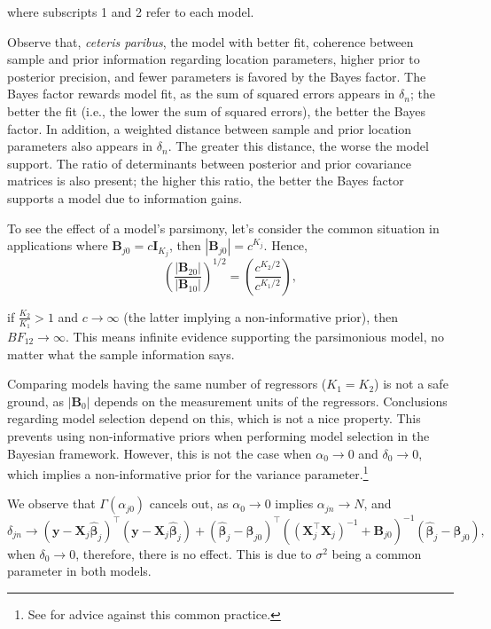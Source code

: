 where subscripts 1 and 2 refer to each model.

Observe that, \textit{ceteris paribus}, the model with better fit, coherence between sample and prior information regarding location parameters, higher prior to posterior precision, and fewer parameters is favored by the Bayes factor. The Bayes factor rewards model fit, as the sum of squared errors appears in \( \delta_n \); the better the fit (i.e., the lower the sum of squared errors), the better the Bayes factor. In addition, a weighted distance between sample and prior location parameters also appears in \( \delta_n \). The greater this distance, the worse the model support. The ratio of determinants between posterior and prior covariance matrices is also present; the higher this ratio, the better the Bayes factor supports a model due to information gains.

To see the effect of a model's parsimony, let's consider the common situation in applications where \( \bm{B}_{j0} = c \bm{I}_{K_j} \), then \( | \bm{B}_{j0} | = c^{K_j} \). Hence, 
\[
\left( \frac{| \bm{B}_{20} |}{| \bm{B}_{10} |} \right)^{1/2} = \left( \frac{c^{K_2/2}}{c^{K_1/2}} \right),
\]

if \( \frac{K_2}{K_1} > 1 \) and \( c \to \infty \) (the latter implying a non-informative prior), then \( BF_{12} \to \infty \). This means infinite evidence supporting the parsimonious model, no matter what the sample information says.

Comparing models having the same number of regressors (\( K_1 = K_2 \)) is not a safe ground, as \( | \bm{B}_0 | \) depends on the measurement units of the regressors. Conclusions regarding model selection depend on this, which is not a nice property. This prevents using non-informative priors when performing model selection in the Bayesian framework. However, this is not the case when \( \alpha_0 \to 0 \) and \( \delta_0 \to 0 \), which implies a non-informative prior for the variance parameter.\footnote{See \cite{gelman2006prior} for advice against this common practice.}

We observe that \( \Gamma(\alpha_{j0}) \) cancels out, as \( \alpha_0 \to 0 \) implies \( \alpha_{jn} \to N \), and 
\[
\delta_{jn} \to ({\bm{y}} - {\bm{X}}_j \hat{\bm{\beta}}_j)^{\top} ({\bm{y}} - {\bm{X}}_j \hat{\bm{\beta}}_j) + (\hat{\bm{\beta}}_j - \bm{\beta}_{j0})^{\top} \left( ({\bm{X}}_j^{\top} {\bm{X}}_j)^{-1} + \bm{B}_{j0} \right)^{-1} (\hat{\bm{\beta}}_j - \bm{\beta}_{j0}),
\]
when $\delta_0 \to 0$, therefore, there is no effect. This is due to \( \sigma^2 \) being a common parameter in both models.

